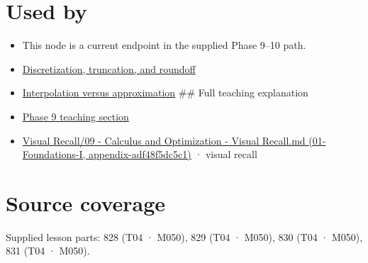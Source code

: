 \section{Used by}\label{appendix-32f39e9a3738-used-by}

\begin{itemize}
\item
  This node is a current endpoint in the supplied Phase 9--10 path.
\item
  \hyperref[appendix-6b0648b2b8e8]{Discretization, truncation, and roundoff}
\item
  \hyperref[appendix-0c2a5f69851e]{Interpolation versus approximation} \#\# Full teaching explanation
\item
  \href{Continuous\%20Notes/Computing\%20Foundations\%20-\%20From\%20Bits\%20to\%20C++\%20and\%20Systems\%20APIs\#Jacobians,\%20curvature,\%20and\%20local\%20approximation}{Phase 9 teaching section}
\item
  \href{../01-Foundations-I/main.pdf\#nameddest=appendix-adf48f5dc5c1}{Visual Recall/09 - Calculus and Optimization - Visual Recall.md (01-Foundations-I, appendix-adf48f5dc5c1)} · visual recall
\end{itemize}

\section{Source coverage}\label{appendix-32f39e9a3738-source-coverage}

Supplied lesson parts: 828 (T04 · M050), 829 (T04 · M050), 830 (T04 · M050), 831 (T04 · M050).

